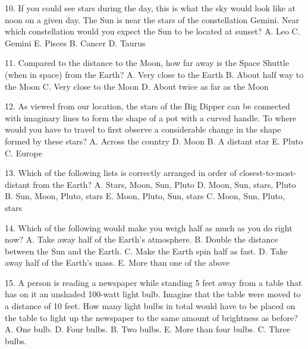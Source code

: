 


10. If you could see stars during the day, this is what the sky would look like at noon on a given
day. The Sun is near the stars of the constellation Gemini. Near which constellation would
you expect the Sun to be located at sunset?
A. Leo
C. Gemini
E. Pisces
B. Cancer
D. Taurus


11. Compared to the distance to the Moon, how far away is the Space Shuttle (when in space)
from the Earth?
A. Very close to the Earth
B. About half way to the Moon
C. Very close to the Moon
D. About twice as far as the Moon

12. As viewed from our location, the stars of the Big Dipper can be connected with imaginary
lines to form the shape of a pot with a curved handle. To where would you have to travel to
first observe a considerable change in the shape formed by these stars?
A. Across the country
D. Moon
B. A distant star
E. Pluto
C. Europe

13. Which of the following lists is correctly arranged in order of closest-to-most-distant from the
Earth?
A. Stars, Moon, Sun, Pluto
D. Moon, Sun, stars, Pluto
B. Sun, Moon, Pluto, stars
E. Moon, Pluto, Sun, stars
C. Moon, Sun, Pluto, stars

14. Which of the following would make you weigh half as much as you do right now?
A. Take away half of the Earth’s atmosphere.
B. Double the distance between the Sun and the Earth.
C. Make the Earth spin half as fast.
D. Take away half of the Earth’s mass.
E. More than one of the above

15. A person is reading a newspaper while standing 5 feet away from a table that has on it an
unshaded 100-watt light bulb. Imagine that the table were moved to a distance of 10 feet.
How many light bulbs in total would have to be placed on the table to light up the newspaper
to the same amount of brightness as before?
A. One bulb.
D. Four bulbs.
B. Two bulbs.
E. More than four bulbs.
C. Three bulbs.

